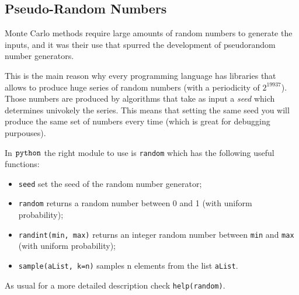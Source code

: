 \documentclass[11pt]{article}
\providecommand{\tightlist}{%
      \setlength{\itemsep}{0pt}\setlength{\parskip}{0pt}}
\begin{document}
    \hypertarget{pseudo-random-numbers}{%
\subsection{Pseudo-Random Numbers}\label{pseudo-random-numbers}}

Monte Carlo methods require large amounts of random numbers to generate
the inputs, and it was their use that spurred the development of
pseudorandom number generators.

This is the main reason why every programming language has libraries
that allows to produce huge series of random numbers (with a periodicity
of \(2^{19937}\)). Those numbers are produced by algorithms that take as
input a \emph{seed} which determines univokely the series. This means
that setting the same seed you will produce the same set of numbers
every time (which is great for debugging purpouses).

In \(\tt{python}\) the right module to use is \texttt{random} which has
the following useful functions:

\begin{itemize}
\tightlist
\item
  \texttt{seed} set the seed of the random number generator;
\item
  \texttt{random} returns a random number between 0 and 1 (with uniform
  probability);
\item
  \texttt{randint(min,\ max)} returns an integer random number between
  \texttt{min} and \texttt{max} (with uniform probability);
\item
  \texttt{sample(aList,\ k=n)} samples n elements from the list
  \texttt{aList}.
\end{itemize}

As usual for a more detailed description check \texttt{help(random)}.
\end{document}
